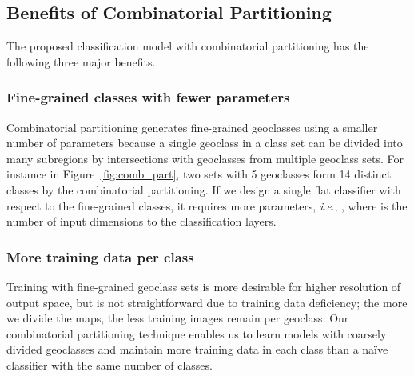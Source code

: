 \documentclass[runningheads]{llncs}
\newcommand{\ie}{\textit{i}.\textit{e}.}
\begin{document}
\subsection{Benefits of Combinatorial Partitioning}
\label{sec:sub:benefits}
The proposed classification model with combinatorial partitioning has the following three major benefits.

\subsubsection{Fine-grained classes with fewer parameters}
Combinatorial partitioning generates fine-grained geoclasses using a smaller number of parameters because a single geoclass in a class set can be divided into many subregions by intersections with geoclasses from multiple geoclass sets.
For instance in Figure~\ref{fig:comb_part}, two sets with 5 geoclasses form 14 distinct classes by the combinatorial partitioning.
If we design a single flat classifier with respect to the fine-grained classes, it requires more parameters, \ie, , where  is the number of input dimensions to the classification layers.
\iffalse
\brk{The naive approach requires significantly more parameters in the classification layer than combinatorial partitioning given the same number of geoclasses---after the combination in our algorithm.
Note that our combinatorial partitioning generates more geoclasses with the same number of parameters because a single geoclass in a class set can be divided into many subregions by intersections of geoclasses in multiple geoclass sets.
For instance, in Figure~\ref{fig:comb_part}, two sets with 5 geoclasses form 14 distinct classes by the combinatorial partitioning, while the network made by a naive partitioning has only 10 distinct classes.}
Note that both cases require the same number of parameters, \ie,  where  is the number of input dimensions to the classifiers.
\fi

\subsubsection{More training data per class}
Training with fine-grained geoclass sets is more desirable for higher resolution of output space, but is not straightforward due to training data deficiency; the more we divide the maps, the less training images remain per geoclass.
Our combinatorial partitioning technique enables us to learn models with coarsely divided geoclasses and maintain more training data in each class than a na\"ive classifier with the same number of classes.
\end{document}
